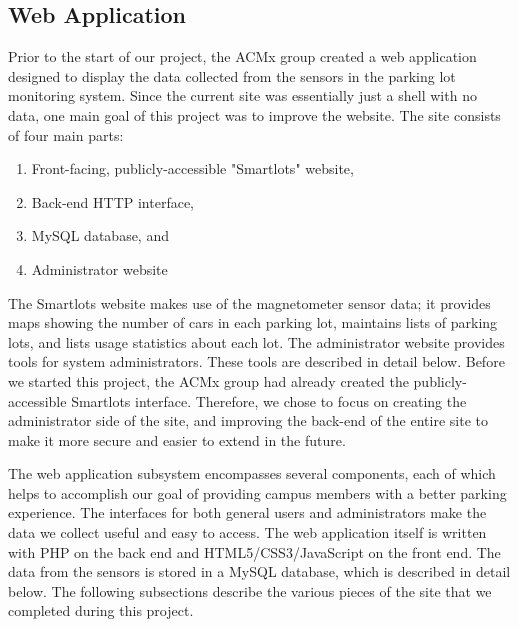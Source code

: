 \documentclass[11pt, oneside, fullpage, doublespace]{article}
\begin{document}
\subsection{Web Application}

Prior to the start of our project, the ACMx group created a web application designed to display the data collected from the sensors in the parking lot monitoring system. Since the current site was essentially just a shell with no data, one main goal of this project was to improve the website. The site consists of four main parts:

\begin{enumerate}
\item Front-facing, publicly-accessible "Smartlots" website,
\item Back-end HTTP interface,
\item MySQL database, and
\item Administrator website
\end{enumerate}

The Smartlots website makes use of the magnetometer sensor data; it provides maps showing the number of cars in each parking lot, maintains lists of parking lots, and lists usage statistics about each lot. The administrator website provides tools for system administrators. These tools are described in detail below. Before we started this project, the ACMx group had already created the publicly-accessible Smartlots interface. Therefore, we chose to focus on creating the administrator side of the site, and improving the back-end of the entire site to make it more secure and easier to extend in the future.

The web application subsystem encompasses several components, each of which helps to accomplish our goal of providing campus members with a better parking experience. The interfaces for both general users and administrators make the data we collect useful and easy to access. The web application itself is written with PHP on the back end and HTML5/CSS3/JavaScript on the front end. The data from the sensors is stored in a MySQL database, which is described in detail below. The following subsections describe the various pieces of the site that we completed during this project.
\end{document}

